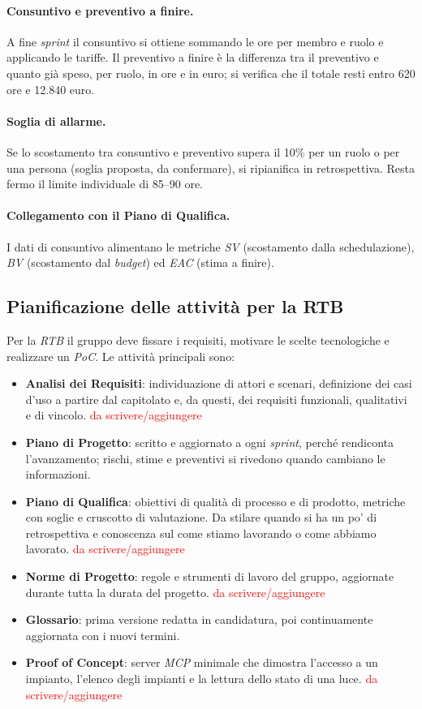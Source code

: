 \documentclass[11pt, a4paper]{article}
\newcommand{\ds}{\textcolor{red}{da scrivere/aggiungere}} %
\begin{document}
	\paragraph{Consuntivo e preventivo a finire.} A fine \textit{sprint} il consuntivo si ottiene sommando le ore per membro e ruolo e applicando le tariffe. Il preventivo a finire è la differenza tra il preventivo e quanto già speso, per ruolo, in ore e in euro; si verifica che il totale resti entro 620 ore e 12.840 euro.
	
	\paragraph{Soglia di allarme.} Se lo scostamento tra consuntivo e preventivo supera il 10\% per un ruolo o per una persona (soglia proposta, da confermare), si ripianifica in retrospettiva. Resta fermo il limite individuale di 85--90 ore.
	
	\paragraph{Collegamento con il Piano di Qualifica.} I dati di consuntivo alimentano le metriche \textit{SV} (scostamento dalla schedulazione), \textit{BV} (scostamento dal \textit{budget}) ed \textit{EAC} (stima a finire).
	
	\subsection{Pianificazione delle attività per la RTB}
	Per la \textit{RTB} il gruppo deve fissare i requisiti, motivare le scelte tecnologiche e realizzare un \textit{PoC}. Le attività principali sono:
	\begin{itemize}
		\item \textbf{Analisi dei Requisiti}: individuazione di attori e scenari, definizione dei casi d'uso a partire dal capitolato e, da questi, dei requisiti funzionali, qualitativi e di vincolo. \ds
		\item \textbf{Piano di Progetto}: scritto e aggiornato a ogni \textit{sprint}, perché rendiconta l'avanzamento; rischi, stime e preventivi si rivedono quando cambiano le informazioni.
		\item \textbf{Piano di Qualifica}: obiettivi di qualità di processo e di prodotto, metriche con soglie e cruscotto di valutazione. Da stilare quando si ha un po' di retrospettiva e conoscenza sul come stiamo lavorando o come abbiamo lavorato. \ds
		\item \textbf{Norme di Progetto}: regole e strumenti di lavoro del gruppo, aggiornate durante tutta la durata del progetto. \ds
		\item \textbf{Glossario}: prima versione redatta in candidatura, poi continuamente aggiornata con i nuovi termini.
		\item \textbf{Proof of Concept}: server \textit{MCP} minimale che dimostra l'accesso a un impianto, l'elenco degli impianti e la lettura dello stato di una luce. \ds
	\end{itemize}
	
\end{document}
